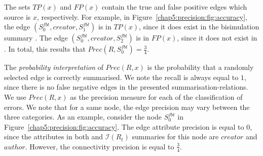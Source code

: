 The sets $TP(x)$ and $FP(x)$ contain the true and false positive edges which source is $x$, respectively. For example, in Figure~\ref{chap5:precision:fig:accuracy}, the edge $(S^{fbt}_0, creator, S^{fbt}_1)$ is in $TP(x)$, since it does exist in the bisimulation summary . The edge $(S^{fbt}_0, creator, S^{fbt}_2)$ is in $FP(x)$, since it does not exist in . In total, this results that $Prec\left(R, S^{fbt}_0\right) = \frac{3}{4}$.

The \emph{probability interpretation} of $Prec(R, x)$ is the probability that a randomly selected edge is correctly summarised. We note the recall is always equal to $1$, since there is no false negative edges in the presented \glspl{summarisation-relation}.\\

We use $Prec(R, x)$ as the precision measure for each of the classification of errors. We note that for a same node, the edge precision may vary between the three categories. As an example, consider the node $S^{fbt}_0$ in Figure~\ref{chap5:precision:fig:accuracy}. The edge attribute precision is equal to $0$, since the \gls{attributes} in both  and $\mathcal{I}(R_t)$ summaries for this node are $creator$ and $author$. However, the connectivity precision is equal to $\frac{3}{4}$.
